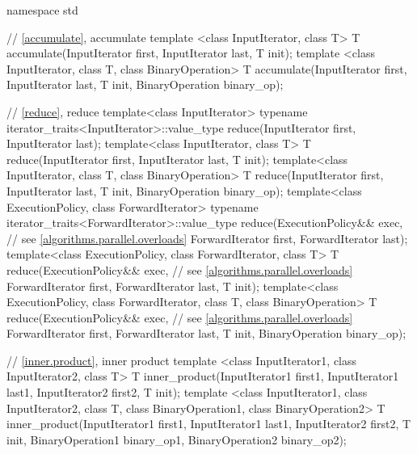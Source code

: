 %
%
\begin{codeblock}
namespace std {
  // \ref{accumulate}, accumulate
  template <class InputIterator, class T>
    T accumulate(InputIterator first, InputIterator last, T init);
  template <class InputIterator, class T, class BinaryOperation>
    T accumulate(InputIterator first, InputIterator last, T init,
                 BinaryOperation binary_op);

  // \ref{reduce}, reduce
  template<class InputIterator>
    typename iterator_traits<InputIterator>::value_type
      reduce(InputIterator first, InputIterator last);
  template<class InputIterator, class T>
    T reduce(InputIterator first, InputIterator last, T init);
  template<class InputIterator, class T, class BinaryOperation>
    T reduce(InputIterator first, InputIterator last, T init,
             BinaryOperation binary_op);
  template<class ExecutionPolicy, class ForwardIterator>
    typename iterator_traits<ForwardIterator>::value_type
      reduce(ExecutionPolicy&& exec, // see \ref{algorithms.parallel.overloads}
             ForwardIterator first, ForwardIterator last);
  template<class ExecutionPolicy, class ForwardIterator, class T>
    T reduce(ExecutionPolicy&& exec, // see \ref{algorithms.parallel.overloads}
             ForwardIterator first, ForwardIterator last, T init);
  template<class ExecutionPolicy, class ForwardIterator, class T, class BinaryOperation>
    T reduce(ExecutionPolicy&& exec, // see \ref{algorithms.parallel.overloads}
             ForwardIterator first, ForwardIterator last, T init,
             BinaryOperation binary_op);

  // \ref{inner.product}, inner product
  template <class InputIterator1, class InputIterator2, class T>
    T inner_product(InputIterator1 first1, InputIterator1 last1,
                    InputIterator2 first2, T init);
  template <class InputIterator1, class InputIterator2, class T,
            class BinaryOperation1, class BinaryOperation2>
    T inner_product(InputIterator1 first1, InputIterator1 last1,
                    InputIterator2 first2, T init,
                    BinaryOperation1 binary_op1,
                    BinaryOperation2 binary_op2);

}
\end{codeblock}
